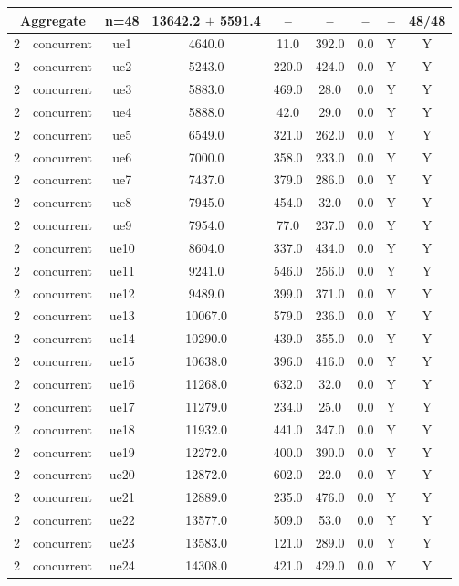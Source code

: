 \begin{table}[ht]
\begin{tabular}{|c|c|c|c|c|c|c|c|c|}
\multicolumn{2}{|c|}{\textbf{Aggregate}} & n=48 & 13642.2 $\pm$ 5591.4 & -- & -- & -- & -- & 48/48 \\
\hline
2 & concurrent & ue1 & 4640.0 & 11.0 & 392.0 & 0.0 & Y & Y \\
2 & concurrent & ue2 & 5243.0 & 220.0 & 424.0 & 0.0 & Y & Y \\
2 & concurrent & ue3 & 5883.0 & 469.0 & 28.0 & 0.0 & Y & Y \\
2 & concurrent & ue4 & 5888.0 & 42.0 & 29.0 & 0.0 & Y & Y \\
2 & concurrent & ue5 & 6549.0 & 321.0 & 262.0 & 0.0 & Y & Y \\
2 & concurrent & ue6 & 7000.0 & 358.0 & 233.0 & 0.0 & Y & Y \\
2 & concurrent & ue7 & 7437.0 & 379.0 & 286.0 & 0.0 & Y & Y \\
2 & concurrent & ue8 & 7945.0 & 454.0 & 32.0 & 0.0 & Y & Y \\
2 & concurrent & ue9 & 7954.0 & 77.0 & 237.0 & 0.0 & Y & Y \\
2 & concurrent & ue10 & 8604.0 & 337.0 & 434.0 & 0.0 & Y & Y \\
2 & concurrent & ue11 & 9241.0 & 546.0 & 256.0 & 0.0 & Y & Y \\
2 & concurrent & ue12 & 9489.0 & 399.0 & 371.0 & 0.0 & Y & Y \\
2 & concurrent & ue13 & 10067.0 & 579.0 & 236.0 & 0.0 & Y & Y \\
2 & concurrent & ue14 & 10290.0 & 439.0 & 355.0 & 0.0 & Y & Y \\
2 & concurrent & ue15 & 10638.0 & 396.0 & 416.0 & 0.0 & Y & Y \\
2 & concurrent & ue16 & 11268.0 & 632.0 & 32.0 & 0.0 & Y & Y \\
2 & concurrent & ue17 & 11279.0 & 234.0 & 25.0 & 0.0 & Y & Y \\
2 & concurrent & ue18 & 11932.0 & 441.0 & 347.0 & 0.0 & Y & Y \\
2 & concurrent & ue19 & 12272.0 & 400.0 & 390.0 & 0.0 & Y & Y \\
2 & concurrent & ue20 & 12872.0 & 602.0 & 22.0 & 0.0 & Y & Y \\
2 & concurrent & ue21 & 12889.0 & 235.0 & 476.0 & 0.0 & Y & Y \\
2 & concurrent & ue22 & 13577.0 & 509.0 & 53.0 & 0.0 & Y & Y \\
2 & concurrent & ue23 & 13583.0 & 121.0 & 289.0 & 0.0 & Y & Y \\
2 & concurrent & ue24 & 14308.0 & 421.0 & 429.0 & 0.0 & Y & Y \\

\end{tabular}
\end{table}
